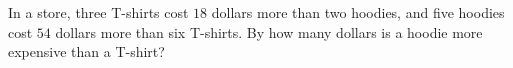 In a store, three T-shirts cost $18$ dollars more than two hoodies, and five hoodies cost $54$ dollars more than six T-shirts. By how many dollars is a hoodie more expensive than a T-shirt?
